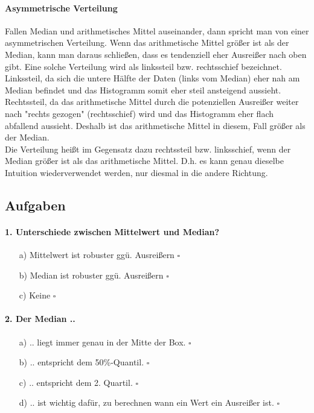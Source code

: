 \documentclass[a4paper]{article}
\begin{document}
\paragraph{Asymmetrische Verteilung} Fallen Median und arithmetisches Mittel auseinander, dann spricht man von einer asymmetrischen Verteilung. Wenn das arithmetische Mittel größer ist als der Median, kann man daraus schließen, dass es tendenziell eher Ausreißer nach oben gibt. Eine solche Verteilung wird als linkssteil bzw. rechtsschief bezeichnet. Linkssteil, da sich die untere Hälfte der Daten (links vom Median) eher nah am Median befindet und das Histogramm somit eher steil ansteigend aussieht. Rechtssteil, da das arithmetische Mittel durch die potenziellen Ausreißer weiter nach "rechts gezogen" (rechtsschief) wird und das Histogramm eher flach abfallend aussieht. Deshalb ist das arithmetische Mittel in diesem, Fall größer als der Median.\\
Die Verteilung heißt im Gegensatz dazu rechtssteil bzw. linksschief, wenn der Median größer ist als das arithmetische Mittel. D.h. es kann genau dieselbe Intuition wiederverwendet werden, nur diesmal in die andere Richtung.

\clearpage

\subsection{Aufgaben}

\paragraph{1. Unterschiede zwischen Mittelwert und Median?}

\begin{itemize}
    \item[a)] Mittelwert ist robuster ggü. Ausreißern \hfill $\square$
    \item[b)] Median ist robuster ggü. Ausreißern   \hfill $\square$
    \item[c)] Keine \hfill $\square$
\end{itemize}

\paragraph{2. Der Median ..}

\begin{itemize}
    \item[a)] .. liegt immer genau in der Mitte der Box. \hfill $\square$
    \item[b)] .. entspricht dem 50\%-Quantil. \hfill $\square$
    \item[c)] .. entspricht dem 2. Quartil. \hfill $\square$
    \item[d)] .. ist wichtig dafür, zu berechnen wann ein Wert ein Ausreißer ist. \hfill $\square$
\end{itemize}
\end{document}
